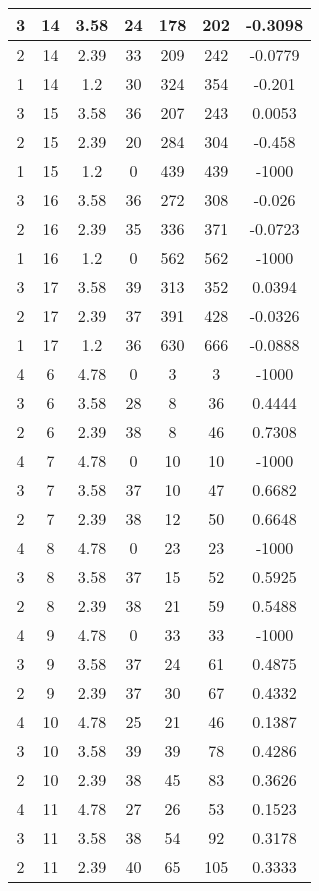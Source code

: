 \documentclass[letterpaper, 12pt]{article}
\begin{document}
\begin{longtable}{|c|c|c|c|c|c|c|}
\hline
3 & 14 & 3.58 & 24 & 178 & 202 & -0.3098 \\
\hline
2 & 14 & 2.39 & 33 & 209 & 242 & -0.0779 \\
\hline
1 & 14 & 1.2 & 30 & 324 & 354 & -0.201 \\
\hline
3 & 15 & 3.58 & 36 & 207 & 243 & 0.0053 \\
\hline
2 & 15 & 2.39 & 20 & 284 & 304 & -0.458 \\
\hline
1 & 15 & 1.2 & 0 & 439 & 439 & -1000 \\
\hline
3 & 16 & 3.58 & 36 & 272 & 308 & -0.026 \\
\hline
2 & 16 & 2.39 & 35 & 336 & 371 & -0.0723 \\
\hline
1 & 16 & 1.2 & 0 & 562 & 562 & -1000 \\
\hline
3 & 17 & 3.58 & 39 & 313 & 352 & 0.0394 \\
\hline
2 & 17 & 2.39 & 37 & 391 & 428 & -0.0326 \\
\hline
1 & 17 & 1.2 & 36 & 630 & 666 & -0.0888 \\
\hline
4 & 6 & 4.78 & 0 & 3 & 3 & -1000 \\
\hline
3 & 6 & 3.58 & 28 & 8 & 36 & 0.4444 \\
\hline
2 & 6 & 2.39 & 38 & 8 & 46 & 0.7308 \\
\hline
4 & 7 & 4.78 & 0 & 10 & 10 & -1000 \\
\hline
3 & 7 & 3.58 & 37 & 10 & 47 & 0.6682 \\
\hline
2 & 7 & 2.39 & 38 & 12 & 50 & 0.6648 \\
\hline
4 & 8 & 4.78 & 0 & 23 & 23 & -1000 \\
\hline
3 & 8 & 3.58 & 37 & 15 & 52 & 0.5925 \\
\hline
2 & 8 & 2.39 & 38 & 21 & 59 & 0.5488 \\
\hline
4 & 9 & 4.78 & 0 & 33 & 33 & -1000 \\
\hline
3 & 9 & 3.58 & 37 & 24 & 61 & 0.4875 \\
\hline
2 & 9 & 2.39 & 37 & 30 & 67 & 0.4332 \\
\hline
4 & 10 & 4.78 & 25 & 21 & 46 & 0.1387 \\
\hline
3 & 10 & 3.58 & 39 & 39 & 78 & 0.4286 \\
\hline
2 & 10 & 2.39 & 38 & 45 & 83 & 0.3626 \\
\hline
4 & 11 & 4.78 & 27 & 26 & 53 & 0.1523 \\
\hline
3 & 11 & 3.58 & 38 & 54 & 92 & 0.3178 \\
\hline
2 & 11 & 2.39 & 40 & 65 & 105 & 0.3333 \\

\end{longtable}
\end{document}

